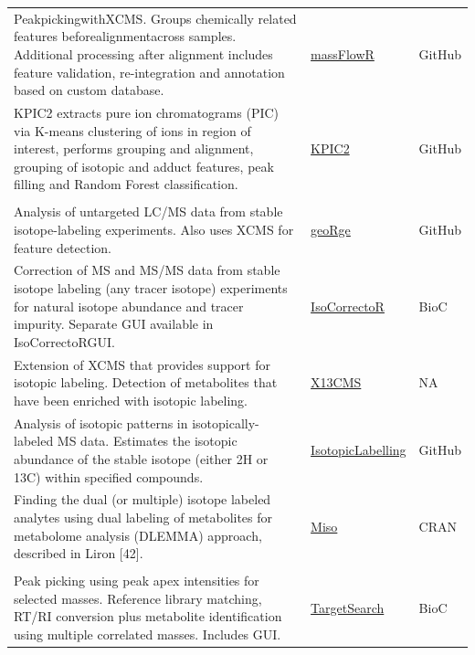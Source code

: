 \documentclass[]{article}
\begin{document}
\begin{longtable}[t]{>{\raggedright\arraybackslash}p{30em}>{\raggedright\arraybackslash}p{10em}>{\raggedright\arraybackslash}p{3em}}
PeakpickingwithXCMS. Groups chemically related features beforealignmentacross samples. Additional processing after alignment includes feature validation, re-integration and annotation based on custom database. & \href{https://github.com/lauzikaite/massFlowR}{massFlowR} & GitHub\\
\rowcolor{gray!6}  KPIC2 extracts pure ion chromatograms (PIC) via K-means clustering of ions in region of interest, performs grouping and alignment, grouping of isotopic and adduct features, peak filling and Random Forest classification. & \href{https://github.com/hcji/KPIC2}{KPIC2} & GitHub\\
\addlinespace[0.3em]
\multicolumn{3}{l}{\textbf{Isotope labeling using MS}}\\
Analysis of untargeted LC/MS data from stable isotope-labeling experiments. Also uses XCMS for feature detection. & \href{https://github.com/jcapelladesto/geoRge}{geoRge} & GitHub\\
\rowcolor{gray!6}  Correction of MS and MS/MS data from stable isotope labeling (any tracer isotope) experiments for natural isotope abundance and tracer impurity. Separate GUI available in IsoCorrectoRGUI. & \href{https://bioconductor.org/packages/release/bioc/html/IsoCorrectoR.html}{IsoCorrectoR} & BioC\\
Extension of XCMS that provides support for isotopic labeling. Detection of metabolites that have been enriched with isotopic labeling. & \href{http://pattilab.wustl.edu/software/x13cms/x13cms.php}{X13CMS} & NA\\
\rowcolor{gray!6}  Analysis of isotopic patterns in isotopically-labeled MS data. Estimates the isotopic abundance of the stable isotope (either 2H or 13C) within specified compounds. & \href{https://github.com/RuggeroFerrazza/IsotopicLabelling}{IsotopicLabelling} & GitHub\\
Finding the dual (or multiple) isotope labeled analytes using dual labeling of metabolites for metabolome analysis (DLEMMA) approach, described in Liron [42]. & \href{https://cran.r-project.org/web/packages/Miso}{Miso} & CRAN\\
\rowcolor{gray!6}  \addlinespace[0.3em]
\multicolumn{3}{l}{\textbf{Targeted MS}}\\
Peak picking using peak apex intensities for selected masses. Reference library matching, RT/RI conversion plus metabolite identification using multiple correlated masses. Includes GUI. & \href{http://bioconductor.org/packages/2.5/bioc/html/TargetSearch.html}{TargetSearch} & BioC\\

\end{longtable}
\end{document}

